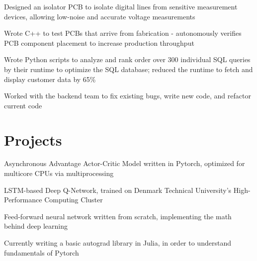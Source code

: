 \documentclass[]{deedy-resume-openfont}
\begin{document}
\vspace{8pt}

\begin{tightemize}
    \item Designed an isolator PCB to isolate digital lines from sensitive measurement devices, allowing low-noise and accurate voltage measurements
    \item Wrote C++ to test PCBs that arrive from fabrication - autonomously verifies PCB component placement to increase production throughput
\end{tightemize}

\vspace{8pt}


\begin{tightemize}
    \item Wrote Python scripts to analyze and rank order over 300 individual SQL queries by their runtime to optimize the SQL database; reduced the runtime to fetch and display customer data by 65\%
    \item Worked with the backend team to fix existing bugs, write new code, and refactor current code
\end{tightemize}

\vspace{12pt}


\section{Projects}

\begin{tightemize}
    \item Asynchronous Advantage Actor-Critic Model written in Pytorch, optimized for multicore CPUs via multiprocessing
    \item LSTM-based Deep Q-Network, trained on Denmark Technical University's High-Performance Computing Cluster
    \item Feed-forward neural network written from scratch, implementing the math behind deep learning
    \item Currently writing a basic autograd library in Julia, in order to understand fundamentals of Pytorch
\end{tightemize}

\vspace{8pt}
\end{document}
